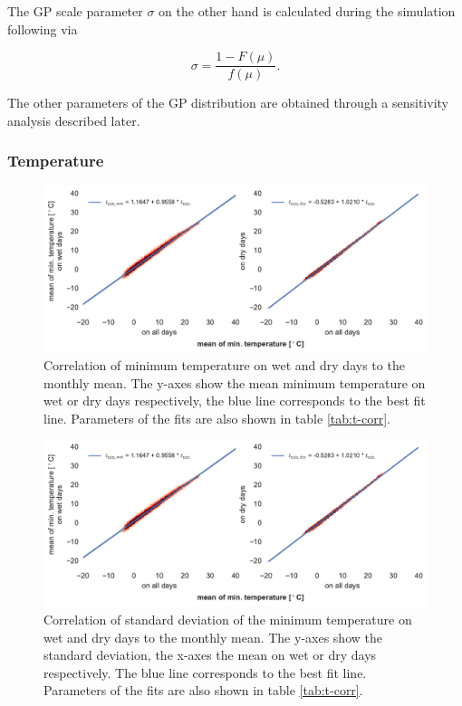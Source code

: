 \begin{refsection}
The GP scale parameter $\sigma$ on the other hand is calculated during the simulation following \cite{NeykovNeytchevZucchini2014} via

\begin{equation}
\sigma = \frac{1 - F(\mu)}{f(\mu)}. \label{eq:gp_scale}
\end{equation}

The other parameters of the GP distribution are obtained through a sensitivity analysis described later.

\subsubsection{Temperature}

\begin{figure}
	\includegraphics[width=12cm]{figures/temp.pdf}
	\caption[Correlation of minimum temperature on wet and dry days to the monthly mean]{Correlation of minimum temperature on wet and dry days to the monthly mean. The y-axes show the mean minimum temperature on wet or dry days respectively, the blue line corresponds to the best fit line. Parameters of the fits are also shown in table \ref{tab:t-corr}.}
	\label{fig:tmin}
\end{figure}
\begin{figure}
	\includegraphics[width=12cm, page=2]{figures/temp.pdf}
	\caption[Correlation of standard deviation of min. temperature to the monthly mean]{Correlation of standard deviation of the minimum temperature on wet and dry days to the monthly mean. The y-axes show the standard deviation, the x-axes the mean on wet or dry days respectively. The blue line corresponds to the best fit line. Parameters of the fits are also shown in table \ref{tab:t-corr}.}

\end{figure}
\end{refsection}
